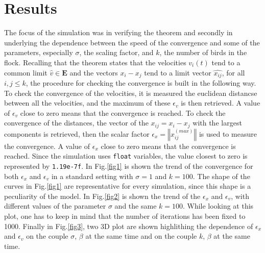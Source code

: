 \documentclass{article} %
\newcounter{math}
\begin{document}
\section {Results}
The focus of the simulation was in verifying the theorem and secondly
in underlying the dependence between the speed of the convergence
and some of the parameters, especially $\sigma$, the scaling factor, and $k$, the number of
birds in the flock.
Recalling that the theorem states that the velocities $v_i(t)$ tend to a common limit $\widehat{v}\in\mathbf{E}$
and the vectors $x_i-x_j$ tend to a limit vector $\widehat{x_{ij}}$, for all $i,j\leq k$, the procedure 
for checking the convergence is built in the following way. To check the convergence of the velocities,
it is measured the euclidean distancse between all the velocities, and the maximum of these $\epsilon_v$
is then retrieved. A value of $\epsilon_v$ close to zero means that the convergence is reached. To check the
convergence of the distances, the vector of the $x_{ij}=x_i-x_j$ with the largest components is retrieved,
then the scalar factor $\epsilon_x = \left\Vert x_{ij}^{(max)} \right\Vert$ is used to measure the convergence. 
A value of $\epsilon_x$
close to zero means that the convergence is reached. Since the simulation uses \verb|float| variables, the 
value closest to zero is represented by \verb|1.19e-7f|. In Fig.\ref{fig1} is shown the trend of the convergence for
both $\epsilon_x$ and $\epsilon_v$ in a standard setting with $\sigma=1$ and $k=100$. The shape of the curves
in Fig.\ref{fig1} are representative for every simulation, since this shape is a peculiarity of the model.
In Fig.\ref{fig2} is shown the trend of the $\epsilon_x$ and $\epsilon_v$, with different values
of the parameter $\sigma$ and the same $k=100$. While looking at this plot, one has to keep in mind that the
number of iterations has been fixed to 1000.
Finally in Fig.\ref{fig3}, two 3D plot are shown highlithing the dependence of $\epsilon_x$ and $\epsilon_v$
on the couple $\sigma$, $\beta$ at the same time and on the couple $k$, $\beta$ at the same time.
\end{document}
